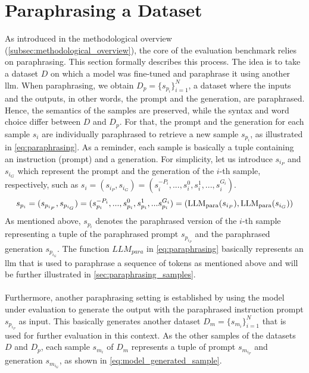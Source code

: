 \section{Paraphrasing a Dataset}\label{sec:paraphrasing_a_dataset}
As introduced in the methodological overview (\autoref{subsec:methodological_overview}), the core of the evaluation benchmark relies on paraphrasing. This section formally describes this process. The idea is to take a dataset $D$ on which a model was fine-tuned and paraphrase it using another \acrshort{llm}. When paraphrasing, we obtain $D_p = \{s_{p_i}\}_{i=1}^N$, a dataset where the inputs and the outputs, in other words, the prompt and the generation, are paraphrased. Hence, the semantics of the samples are preserved, while the syntax and word choice differ between $D$ and $D_p$. For that, the prompt and the generation for each sample $s_i$ are individually paraphrased to retrieve a new sample $s_{p_i}$, as illustrated in \autoref{eq:paraphrasing}. As a reminder, each sample is basically a tuple containing an instruction (prompt) and a generation. For simplicity, let us introduce $s_{i_P}$ and $s_{i_G}$ which represent the prompt and the generation of the $i$-th sample, respectively, such as $s_i = (s_{i_P}, s_{i_G}) = (s_i^{-P_i},...,s_i^{0}, s_i^1,...,s_i^{G_i})$.
\begin{equation}
    s_{p_i} = 
    (
    s_{p_{i_P}},
    s_{p_{i_G}}
    ) =
    (
        s_{p_i}^{-P_i},...,s_{p_i}^{0},
        s_{p_i}^{1},...s_{p_i}^{G_i}
    ) = 
    (
        \operatorname{LLM_{para}}(s_{i_P}), 
        \operatorname{LLM_{para}}(s_{i_G})
    )
    \label{eq:paraphrasing}
\end{equation}
As mentioned above, $s_{p_i}$ denotes the paraphrased version of the $i$-th sample representing a tuple of the paraphrased prompt $s_{p_{i_P}}$ and the paraphrased generation $s_{p_{i_G}}$. The function $LLM_{para}$ in \autoref{eq:paraphrasing} basically represents an \acrshort{llm} that is used to paraphrase a sequence of tokens as mentioned above and will be further illustrated in \autoref{sec:paraphrasing_samples}.
\\\\
Furthermore, another paraphrasing setting is established by using the model under evaluation to generate the output with the paraphrased instruction prompt $s_{p_{i_P}}$ as input. This basically generates another dataset $D_m = \{s_{m_i}\}_{i=1}^N$ that is used for further evaluation in this context. As the other samples of the datasets $D$ and $D_p$, each sample $s_{m_i}$ of $D_m$ represents a tuple of prompt $s_{m_{i_P}}$ and generation $s_{m_{i_G}}$, as shown in \autoref{eq:model_generated_sample}.
